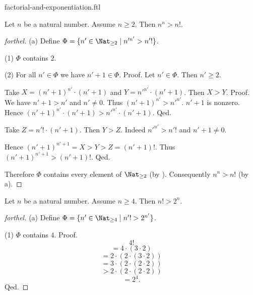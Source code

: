\documentclass{naproche-library}
\begin{document}
\begin{smodule}[title=Factorial and Exponentiation]{factorial-and-exponentiation.ftl}

\begin{proposition}[forthel,id=ARITHMETIC_12_8113296594960384]
  Let $n$ be a natural number.
  Assume $n \geq 2$.
  Then $n^{n} > n!$.
\end{proposition}
\begin{proof}[forthel]
  (a) Define $\Phi = \{ n' \in \Nat_{\geq 2} \mid n'^{n'} > n'! \}$.

  (1) $\Phi$ contains $2$.

  (2) For all $n' \in \Phi$ we have $n' + 1 \in \Phi$. \newline
  Proof.
    Let $n' \in \Phi$.
    Then $n' \geq 2$.

    Take $X = (n' + 1)^{n'} \cdot (n' + 1)$ and $Y = n'^{n'} \cdot (n' + 1)$.
    Then $X > Y$. \newline
    Proof.
      We have $n' + 1 > n'$ and $n' \neq 0$.
      Thus $(n' + 1)^{n'} > n'^{n'}$.
      $n' + 1$ is nonzero.
      Hence $(n' + 1)^{n'} \cdot (n' + 1) > n'^{n'} \cdot (n' + 1)$.
    Qed.

    Take $Z = n'! \cdot (n' + 1)$.
    Then $Y > Z$.
    Indeed $n'^{n'} > n'!$ and $n' + 1 \neq 0$.

    Hence $(n' + 1)^{n' + 1} = X > Y > Z = (n' + 1)!$.
    Thus $(n' + 1)^{n' + 1} > (n' + 1)!$.
  Qed.

  Therefore $\Phi$ contains every element of $\Nat_{\geq 2}$ (by ).
  Consequently $n^{n} > n!$ (by a).
\end{proof}

\begin{proposition}[forthel,id=ARITHMETIC_12_5413271156817920]
  Let $n$ be a natural number.
  Assume $n \geq 4$.
  Then $n! > 2^{n}$.
\end{proposition}
\begin{proof}[forthel]
  (a) Define $\Phi = \{ n' \in \Nat_{\geq 4} \mid n'! > 2^{n'} \}$.

  (1) $\Phi$ contains $4$. \newline
  Proof.
    \[  4!                                  \]
    \[    = 4 \cdot (3 \cdot 2)             \]
    \[    = 2 \cdot (2 \cdot (3 \cdot 2))   \]
    \[    = 3 \cdot (2 \cdot (2 \cdot 2))   \]
    \[    > 2 \cdot (2 \cdot (2 \cdot 2))   \]
    \[    = 2^{4}.                          \]
  Qed.


\end{proof}
\end{smodule}
\end{document}
